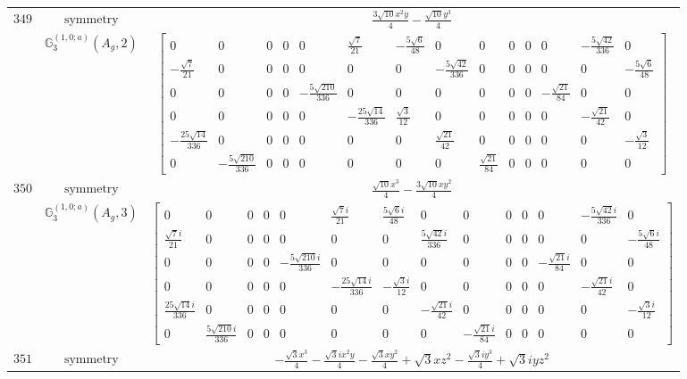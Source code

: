 \documentclass[fleqn,8pt,landscape]{jsarticle}
\begin{document}
\begin{longtable}{ccc}
$ 349 $ & $ \text{symmetry} $ & $ \frac{3 \sqrt{10} x^{2} y}{4} - \frac{\sqrt{10} y^{3}}{4} $ \\
$  $ & $ \mathbb{G}_{3}^{(1,0;a)}(A_{g},2) $ & $ \begin{bmatrix} 0 & 0 & 0 & 0 & 0 & \frac{\sqrt{7}}{21} & - \frac{5 \sqrt{6}}{48} & 0 & 0 & 0 & 0 & 0 & - \frac{5 \sqrt{42}}{336} & 0 \\ - \frac{\sqrt{7}}{21} & 0 & 0 & 0 & 0 & 0 & 0 & - \frac{5 \sqrt{42}}{336} & 0 & 0 & 0 & 0 & 0 & - \frac{5 \sqrt{6}}{48} \\ 0 & 0 & 0 & 0 & - \frac{5 \sqrt{210}}{336} & 0 & 0 & 0 & 0 & 0 & 0 & - \frac{\sqrt{21}}{84} & 0 & 0 \\ 0 & 0 & 0 & 0 & 0 & - \frac{25 \sqrt{14}}{336} & \frac{\sqrt{3}}{12} & 0 & 0 & 0 & 0 & 0 & - \frac{\sqrt{21}}{42} & 0 \\ - \frac{25 \sqrt{14}}{336} & 0 & 0 & 0 & 0 & 0 & 0 & \frac{\sqrt{21}}{42} & 0 & 0 & 0 & 0 & 0 & - \frac{\sqrt{3}}{12} \\ 0 & - \frac{5 \sqrt{210}}{336} & 0 & 0 & 0 & 0 & 0 & 0 & \frac{\sqrt{21}}{84} & 0 & 0 & 0 & 0 & 0 \end{bmatrix} $ \\ \hline
$ 350 $ & $ \text{symmetry} $ & $ \frac{\sqrt{10} x^{3}}{4} - \frac{3 \sqrt{10} x y^{2}}{4} $ \\
$  $ & $ \mathbb{G}_{3}^{(1,0;a)}(A_{g},3) $ & $ \begin{bmatrix} 0 & 0 & 0 & 0 & 0 & \frac{\sqrt{7} i}{21} & \frac{5 \sqrt{6} i}{48} & 0 & 0 & 0 & 0 & 0 & - \frac{5 \sqrt{42} i}{336} & 0 \\ \frac{\sqrt{7} i}{21} & 0 & 0 & 0 & 0 & 0 & 0 & \frac{5 \sqrt{42} i}{336} & 0 & 0 & 0 & 0 & 0 & - \frac{5 \sqrt{6} i}{48} \\ 0 & 0 & 0 & 0 & - \frac{5 \sqrt{210} i}{336} & 0 & 0 & 0 & 0 & 0 & 0 & - \frac{\sqrt{21} i}{84} & 0 & 0 \\ 0 & 0 & 0 & 0 & 0 & - \frac{25 \sqrt{14} i}{336} & - \frac{\sqrt{3} i}{12} & 0 & 0 & 0 & 0 & 0 & - \frac{\sqrt{21} i}{42} & 0 \\ \frac{25 \sqrt{14} i}{336} & 0 & 0 & 0 & 0 & 0 & 0 & - \frac{\sqrt{21} i}{42} & 0 & 0 & 0 & 0 & 0 & - \frac{\sqrt{3} i}{12} \\ 0 & \frac{5 \sqrt{210} i}{336} & 0 & 0 & 0 & 0 & 0 & 0 & - \frac{\sqrt{21} i}{84} & 0 & 0 & 0 & 0 & 0 \end{bmatrix} $ \\ \hline
$ 351 $ & $ \text{symmetry} $ & $ - \frac{\sqrt{3} x^{3}}{4} - \frac{\sqrt{3} i x^{2} y}{4} - \frac{\sqrt{3} x y^{2}}{4} + \sqrt{3} x z^{2} - \frac{\sqrt{3} i y^{3}}{4} + \sqrt{3} i y z^{2} $ \\

\end{longtable}
\end{document}
